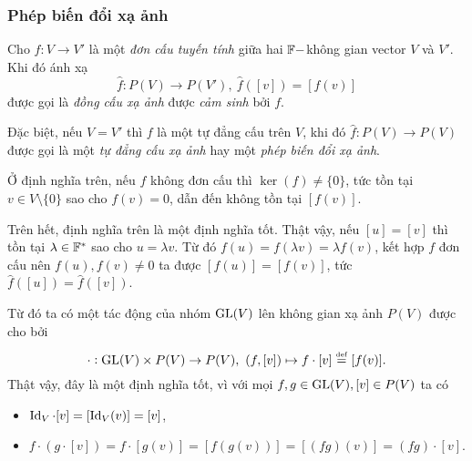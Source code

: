 \subsubsection{Phép biến đổi xạ ảnh}
\begin{defn}
    Cho $f: V \to V'$ là một \textit{đơn cấu tuyến tính} giữa hai $\mathbb{F}-$không gian vector $V$ và $V'$. Khi đó ánh xạ
    \[\widehat{f}: P(V) \to P(V'),~\widehat{f}([v]) = [f(v)]\]
    được gọi là \textit{đồng cấu xạ ảnh} được \textit{cảm sinh} bởi $f$.

    Đặc biệt, nếu $V = V'$ thì $f$ là một tự đẳng cấu trên $V$, khi đó  $\widehat{f}: P(V) \to P(V)$ được gọi là một \textit{tự đẳng cấu xạ ảnh} hay một \textit{phép biến đổi xạ ảnh}.
\end{defn}
\begin{comment*}
    Ở định nghĩa trên, nếu $f$ không đơn cấu thì $\ker(f) \neq \{0\}$, tức tồn tại $v \in V\setminus \{0\}$ sao cho $f(v) = 0$, dẫn đến không tồn tại $[f(v)]$. 
    
    Trên hết, định nghĩa trên là một định nghĩa tốt. Thật vậy, nếu $[u] = [v]$ thì tồn tại $\lambda \in \F^*$ sao cho $u =\lambda v$. Từ đó $f(u) = f(\lambda v)= \lambda f(v)$, kết hợp $f$ đơn cấu nên $f(u), f(v) \neq 0$ ta được $[f(u)] =[f(v)]$, tức $\widehat{f}([u]) = \widehat{f}([v])$.

    Từ đó ta có một tác động của nhóm $\GL(V)$ lên không gian xạ ảnh $P(V)$ được cho bởi
    \[\cdot:\GL(V) \times P(V) \to P(V),~(f,[v]) \mapsto f\cdot [v] \defeq [f(v)].\]
    Thật vậy, đây là một định nghĩa tốt, vì với mọi $f,g \in \GL(V),[v]\in P(V)$ ta có
    \begin{itemize}
        \item $\Id_V \cdot [v] = [\Id_V(v)] = [v]$,
        \item $f\cdot (g \cdot [v]) = f\cdot[g(v)] = [f(g(v))] = [(fg)(v)] = (fg)\cdot [v]$.
    \end{itemize}
    
\end{comment*}
